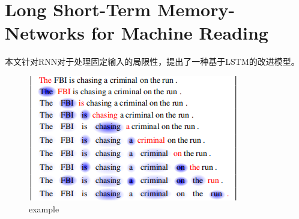 \documentclass[a4paper,UTF8]{article}
\numberwithin{equation}{section}
\begin{document}
\section{Long Short-Term Memory-Networks for Machine Reading}
本文针对RNN对于处理固定输入的局限性，提出了一种基于LSTM的改进模型。
\begin{figure}[H]
    \centering
    \includegraphics[]{6-2.png}
    \caption{example}
\end{figure}
\end{document}
